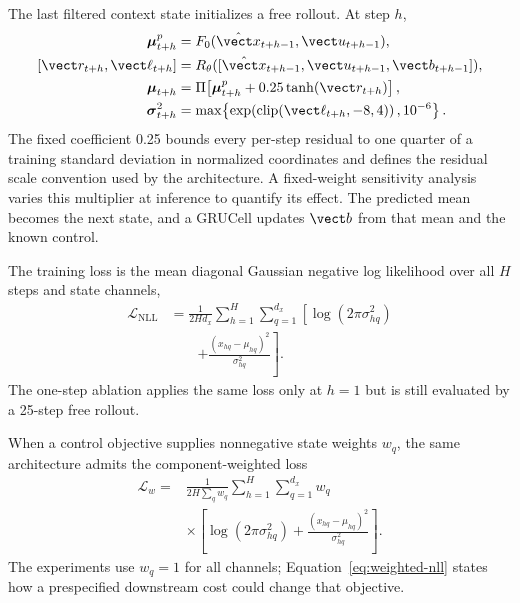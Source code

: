 The last filtered context state initializes a free rollout. At step $h$,
\begin{align}
 \boldsymbol\mu^{p}_{t+h} &= F_0(\hat{\vect x}_{t+h-1},\vect u_{t+h-1}),\\
 [\vect r_{t+h},\vect \ell_{t+h}] &=
 R_\theta([\hat{\vect x}_{t+h-1},\vect u_{t+h-1},\vect b_{t+h-1}]),\\
 \boldsymbol\mu_{t+h} &= \Pi\!\left[
 \boldsymbol\mu^{p}_{t+h}+0.25\tanh(\vect r_{t+h})\right],\\
 \boldsymbol\sigma^2_{t+h} &=
 \max\!\left\{\exp\!\left(\operatorname{clip}(\vect\ell_{t+h},-8,4)\right),
 10^{-6}\right\}.
 \label{eq:residual-rollout}
\end{align}
The fixed coefficient 0.25 bounds every per-step residual to one quarter of a
training standard deviation in normalized coordinates and defines the residual
scale convention used by the architecture. A fixed-weight sensitivity analysis
varies this multiplier at inference to quantify its effect. The predicted mean becomes
the next state, and a GRUCell updates $\vect b$ from that mean and the known
control.

The training loss is the mean diagonal Gaussian negative log likelihood over
all $H$ steps and state channels,
\begin{equation}
\begin{aligned}
 \mathcal L_{\mathrm{NLL}}
 &=\frac{1}{2Hd_x}\sum_{h=1}^{H}\sum_{q=1}^{d_x}
 \left[\log(2\pi\sigma^2_{hq})\right.\\[-0.2em]
 &\qquad\left.+\frac{(x_{hq}-\mu_{hq})^2}{\sigma^2_{hq}}\right].
\end{aligned}
 \label{eq:nll}
\end{equation}
The one-step ablation applies the same loss only at $h=1$ but is still
evaluated by a 25-step free rollout.

When a control objective supplies nonnegative state weights $w_q$, the same
architecture admits the component-weighted loss
\begin{equation}
 \begin{aligned}
 \mathcal L_w={}&\frac{1}{2H\sum_q w_q}
 \sum_{h=1}^{H}\sum_{q=1}^{d_x}w_q \\
 &\times\left[\log(2\pi\sigma^2_{hq})+
 \frac{(x_{hq}-\mu_{hq})^2}{\sigma^2_{hq}}\right].
 \end{aligned}
 \label{eq:weighted-nll}
\end{equation}
The experiments use $w_q=1$ for all channels; Equation~\eqref{eq:weighted-nll}
states how a prespecified downstream cost could change that objective.

